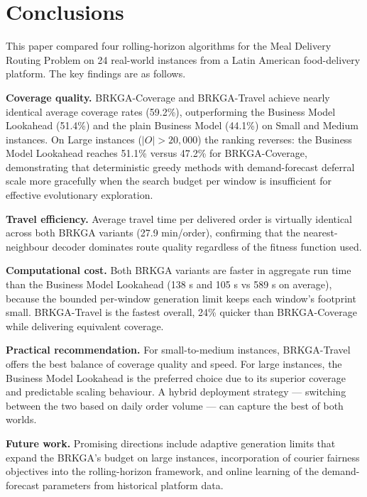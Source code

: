 
\section{Conclusions}\label{sec:conclusions}

This paper compared four rolling-horizon algorithms for the
Meal Delivery Routing Problem on 24 real-world instances from
a Latin American food-delivery platform.
The key findings are as follows.

\textbf{Coverage quality.}
BRKGA-Coverage and BRKGA-Travel achieve nearly identical
average coverage rates (59.2\%), outperforming the Business Model
Lookahead (51.4\%) and the plain Business Model (44.1\%) on
Small and Medium instances.
On Large instances ($|O|>20{,}000$) the ranking reverses:
the Business Model Lookahead reaches 51.1\% versus 47.2\% for
BRKGA-Coverage, demonstrating that deterministic greedy methods
with demand-forecast deferral scale more gracefully when the
search budget per window is insufficient for effective
evolutionary exploration.

\textbf{Travel efficiency.}
Average travel time per delivered order is virtually identical
across both BRKGA variants (27.9 min/order), confirming that
the nearest-neighbour decoder dominates route quality regardless
of the fitness function used.

\textbf{Computational cost.}
Both BRKGA variants are faster in aggregate run time than the
Business Model Lookahead (138 s and 105 s vs 589 s on average),
because the bounded per-window generation limit keeps each
window's footprint small.
BRKGA-Travel is the fastest overall, 24\% quicker than
BRKGA-Coverage while delivering equivalent coverage.

\textbf{Practical recommendation.}
For small-to-medium instances, BRKGA-Travel offers the best
balance of coverage quality and speed.
For large instances, the Business Model Lookahead is the
preferred choice due to its superior coverage and predictable
scaling behaviour.
A hybrid deployment strategy — switching between the two
based on daily order volume — can capture the best of both worlds.

\textbf{Future work.}
Promising directions include adaptive generation limits that
expand the BRKGA's budget on large instances, incorporation of
courier fairness objectives into the rolling-horizon framework,
and online learning of the demand-forecast parameters from
historical platform data.
